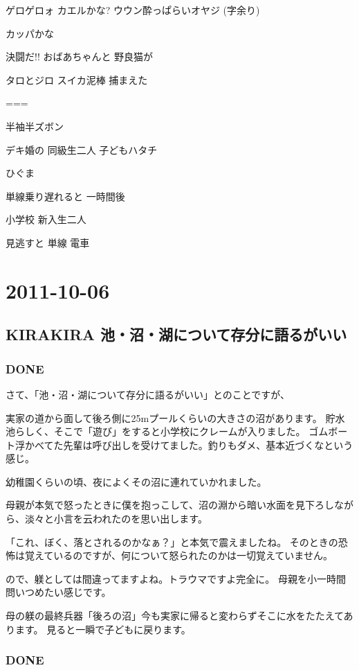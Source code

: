 \documentclass[11pt]{article}
\begin{document}
ゲロゲロォ カエルかな? ウウン酔っぱらいオヤジ
(字余り)

カッパかな 

決闘だ!! おばあちゃんと 野良猫が

タロとジロ スイカ泥棒 捕まえた

===


半袖半ズボン

デキ婚の 同級生二人 子どもハタチ

ひぐま

単線乗り遅れると 一時間後

小学校 新入生二人 

見逃すと 単線 電車
\section{2011-10-06}
\label{sec-60}
\subsection{KIRAKIRA 池・沼・湖について存分に語るがいい}
\label{sec-60_1}
\subsubsection{\textbf{DONE}}
\label{sec-60_1_1}

さて、「池・沼・湖について存分に語るがいい」とのことですが、

実家の道から面して後ろ側に25mプールくらいの大きさの沼があります。
貯水池らしく、そこで「遊び」をすると小学校にクレームが入りました。
ゴムボート浮かべてた先輩は呼び出しを受けてました。釣りもダメ、基本近づくなという感じ。

幼稚園くらいの頃、夜によくその沼に連れていかれました。

母親が本気で怒ったときに僕を抱っこして、沼の淵から暗い水面を見下ろしながら、淡々と小言を云われたのを思い出します。

「これ、ぼく、落とされるのかなぁ？」と本気で震えましたね。
そのときの恐怖は覚えているのですが、何について怒られたのかは一切覚えていません。

ので、躾としては間違ってますよね。トラウマですよ完全に。
母親を小一時間問いつめたい感じです。

母の躾の最終兵器「後ろの沼」今も実家に帰ると変わらずそこに水をたたえてあります。
見ると一瞬で子どもに戻ります。
\subsubsection{\textbf{DONE}}
\label{sec-60_1_2}
\end{document}
